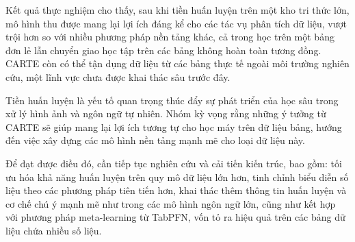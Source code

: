 \documentclass{article}
\begin{document}
Kết quả thực nghiệm cho thấy, sau khi tiền huấn luyện trên một kho tri thức lớn, mô hình thu được mang lại lợi ích đáng kể cho các tác vụ phân tích dữ liệu, vượt trội hơn so với nhiều phương pháp nền tảng khác, cả trong học trên một bảng đơn lẻ lẫn chuyển giao học tập trên các bảng không hoàn toàn tương đồng. CARTE còn có thể tận dụng dữ liệu từ các bảng thực tế ngoài môi trường nghiên cứu, một lĩnh vực chưa được khai thác sâu trước đây.

Tiền huấn luyện là yếu tố quan trọng thúc đẩy sự phát triển của học sâu trong xử lý hình ảnh và ngôn ngữ tự nhiên. Nhóm kỳ vọng rằng những ý tưởng từ CARTE sẽ giúp mang lại lợi ích tương tự cho học máy trên dữ liệu bảng, hướng đến việc xây dựng các mô hình nền tảng mạnh mẽ cho loại dữ liệu này.

Để đạt được điều đó, cần tiếp tục nghiên cứu và cải tiến kiến trúc, bao gồm: tối ưu hóa khả năng huấn luyện trên quy mô dữ liệu lớn hơn, tinh chỉnh biểu diễn số liệu theo các phương pháp tiên tiến hơn, khai thác thêm thông tin huấn luyện và cơ chế chú ý mạnh mẽ như trong các mô hình ngôn ngữ lớn, cũng như kết hợp với phương pháp meta-learning từ TabPFN, vốn tỏ ra hiệu quả trên các bảng dữ liệu chứa nhiều số liệu.

\end{document}
